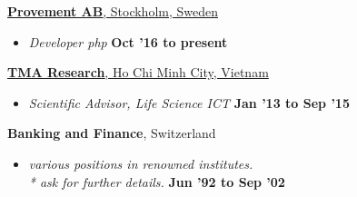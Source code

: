 \documentclass[10pt]{article}
\newenvironment{innerlist}[1][\enskip\textbullet]%
                                                                            {\begin{itemize}[#1,leftmargin=*,parsep=0pt,itemsep=0pt,topsep=0pt,partopsep=0pt]}
                                                                            {\end{itemize}}
\newcommand{\halfblankline}{\quad\vspace{-0.5\baselineskip}\pagebreak[3]}
\begin{document}
                                                                                           \href{www.provement.se}{\textbf{Provement AB}, Stockholm, Sweden}
                                                                                           \begin{innerlist}
                                                                                           \item[] \textit{Developer php}
                                                                                             \hfill \textbf{Oct '16 to present}
                                                                                           \end{innerlist}
                                                                                           \halfblankline


                                                                                           \href{www.tmaresearch.com}{\textbf{TMA Research}, Ho Chi Minh City,
                                                                                             Vietnam}
                                                                                           \begin{innerlist}
                                                                                           \item[] \textit{Scientific Advisor, Life Science ICT}
                                                                                             \hfill \textbf{Jan '13 to Sep '15}
                                                                                           \end{innerlist}
                                                                                           \halfblankline


                                                                                           {\textbf{Banking and Finance}},
                                                                                           Switzerland
                                                                                           \begin{innerlist}
                                                                                           \item[] \textit{various positions in renowned institutes. \\*
                                                                                             ask for further details.}%
                                                                                             \hfill \textbf{Jun '92 to Sep '02}
                                                                                           \end{innerlist}
\end{document}
